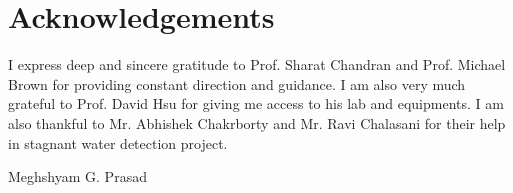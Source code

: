 \documentclass[11pt]{article}
\begin{document}
\def\title{Quadcopter Based Applications in Imaging}
\def\what{Third Annual Progress Report}
\def\degree{Doctor of Philosophy}
\def\who{Meghshyam G. Prasad}
\def\roll{124058001}
\def\guide{Prof. Sharat Chandran \\ Prof. Michael Brown}
\titlpage
\def\bsq{\begin{flushright} $\blacksquare$\\ \end{flushright}}
\def\tab{\hspace{5mm}}

\newpage
\section*{Acknowledgements}
I express deep and sincere gratitude to Prof. Sharat Chandran and Prof.
Michael Brown for providing constant direction and guidance. I am also
very much grateful to Prof. David Hsu for giving me access to his lab and
equipments. I am also thankful to Mr. Abhishek Chakrborty and Mr. Ravi Chalasani
for their help in stagnant water detection project.

\begin{flushright}
Meghshyam G. Prasad
\end{flushright}
\end{document}
